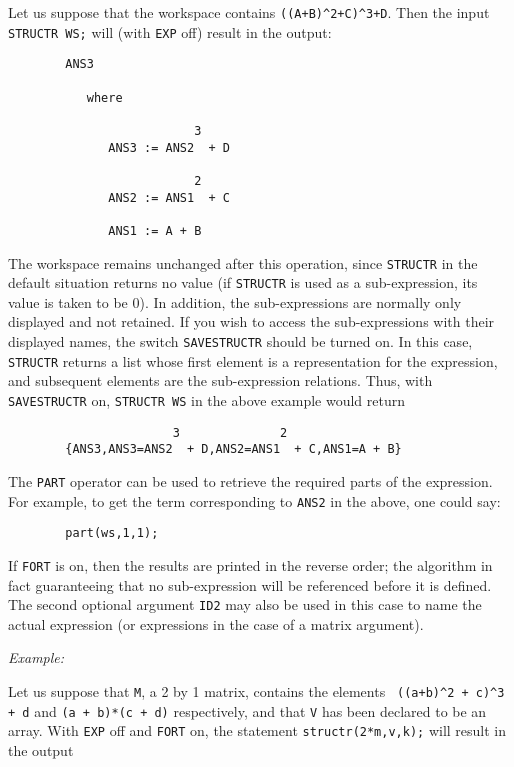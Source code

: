 Let us suppose that the workspace contains {\tt ((A+B)\verb|^|2+C)\verb|^|3+D}.
Then the input {\tt STRUCTR WS;} will (with {\tt EXP} off) result in the
output:\pagebreak[1]
\begin{samepage}
\begin{verbatim}
        ANS3

           where

                          3
              ANS3 := ANS2  + D

                          2
              ANS2 := ANS1  + C

              ANS1 := A + B
\end{verbatim}
\end{samepage}
The workspace remains unchanged after this operation, since {\tt STRUCTR}
 in the default situation returns
no value (if {\tt STRUCTR} is used as a sub-expression, its value is taken
to be 0).  In addition, the sub-expressions are normally only displayed
and not retained. If you wish to access the sub-expressions with their
displayed names, the switch {\tt SAVESTRUCTR} should be
turned on.  In this case, {\tt STRUCTR} returns a list whose first element
is a representation for the expression, and subsequent elements are the
sub-expression relations.  Thus, with {\tt SAVESTRUCTR} on, {\tt STRUCTR WS}
in the above example would return
\begin{verbatim}
                       3              2
        {ANS3,ANS3=ANS2  + D,ANS2=ANS1  + C,ANS1=A + B}
\end{verbatim}
The {\tt PART} operator can
be used to retrieve the required parts of the expression.  For example, to
get the term corresponding to {\tt ANS2} in the above, one could say:
\begin{verbatim}
        part(ws,1,1);
\end{verbatim}
If {\tt FORT} is on, then the results are printed in the reverse order; the
algorithm in fact guaranteeing that no sub-expression will be referenced
before it is defined.  The second optional argument {\tt ID2} may also be
used in this case to name the actual expression (or expressions in the
case of a matrix argument).

{\it Example:}

Let us suppose that {\tt M}, a 2 by 1 matrix, contains the elements {\tt
((a+b)\verb|^|2 + c)\verb|^|3 + d} and {\tt (a + b)*(c + d)} respectively,
and that {\tt V} has been declared to be an array.  With {\tt EXP} off and
{\tt FORT} on, the statement {\tt structr(2*m,v,k);} will result in the output

